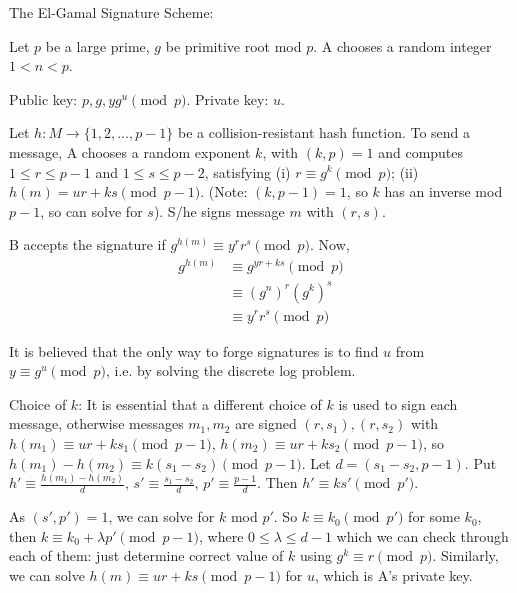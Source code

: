 \documentclass[a4paper]{article}
\begin{document}
The El-Gamal Signature Scheme:

Let $p$ be a large prime, $g$ be primitive root mod $p$. A chooses a random integer $1 < n < p$.

Public key: $p,g,yg^u \pmod p$. Private key: $u$.

Let $h: M \to \{1,2,...,p-1\}$ be a collision-resistant hash function. To send a message, A chooses a random exponent $k$, with $(k,p) = 1$ and computes $1 \leq r \leq p-1$ and $1 \leq s \leq p-2$, satisfying (i) $r \equiv g^k \pmod p$; (ii) $h(m) = ur + ks \pmod {p-1}$. (Note: $(k,p-1) = 1$, so $k$ has an inverse mod $p-1$, so can solve for $s$). S/he signs message $m$ with $(r,s)$.

B accepts the signature if $g^{h(m)} \equiv y^r r^s \pmod p$. Now,
\begin{equation*}
\begin{aligned}
g^{h(m)} &\equiv g^{yr+ks} \pmod p\\
&\equiv (g^n)^r (g^k)^s\\
&\equiv y^r r^s \pmod p
\end{aligned}
\end{equation*}

It is believed that the only way to forge signatures is to find $u$ from $y \equiv g^u \pmod p$, i.e. by solving the discrete log problem.

Choice of $k$: It is essential that a different choice of $k$ is used to sign each message, otherwise messages $m_1,m_2$ are signed $(r,s_1),(r,s_2)$ with $h(m_1) \equiv ur + ks_1 \pmod {p-1}$, $h(m_2) \equiv ur + ks_2 \pmod {p-1}$, so $h(m_1) - h(m_2) \equiv k(s_1-s_2) \pmod {p-1}$. Let $d = (s_1-s_2,p-1)$. Put $h' \equiv \frac{h(m_1)-h(m_2)}{d}$, $s' \equiv \frac{s_1-s_2}{d}$, $p' \equiv \frac{p-1}{d}$. Then $h' \equiv ks' \pmod {p'}$.

As $(s',p') =1$, we can solve for $k$ mod $p'$. So $k \equiv k_0 \pmod {p'}$ for some $k_0$, then $k \equiv k_0 + \lambda p' \pmod {p-1}$, where $0 \leq \lambda \leq d-1$ which we can check through each of them: just determine correct value of $k$ using $g^k \equiv r \pmod p$. Similarly, we can solve $h(m) \equiv ur + ks \pmod {p-1}$ for $u$, which is A's private key.

\end{document}
